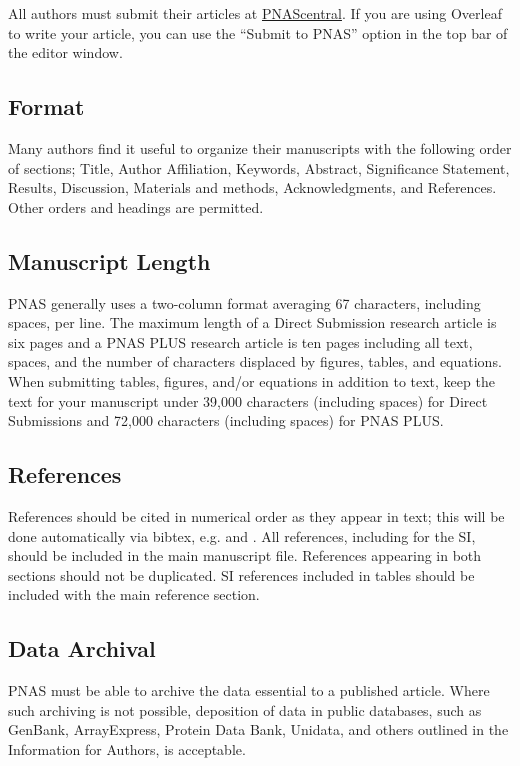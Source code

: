 \documentclass[9pt,twocolumn,twoside,lineno]{pnas-new}
\begin{document}
All authors must submit their articles at \href{http://www.pnascentral.org/cgi-bin/main.plex}{PNAScentral}. If you are using Overleaf to write your article, you can use the ``Submit to PNAS'' option in the top bar of the editor window.

\subsection*{Format}

Many authors find it useful to organize their manuscripts with the following order of sections;  Title, Author Affiliation, Keywords, Abstract, Significance Statement, Results, Discussion, Materials and methods, Acknowledgments, and References. Other orders and headings are permitted.

\subsection*{Manuscript Length}

PNAS generally uses a two-column format averaging 67 characters, including spaces, per line. The maximum length of a Direct Submission research article is six pages and a PNAS PLUS research article is ten pages including all text, spaces, and the number of characters displaced by figures, tables, and equations.  When submitting tables, figures, and/or equations in addition to text, keep the text for your manuscript under 39,000 characters (including spaces) for Direct Submissions and 72,000 characters (including spaces) for PNAS PLUS.

\subsection*{References}

References should be cited in numerical order as they appear in text; this will be done automatically via bibtex, e.g. \cite{belkin2002using} and \cite{berard1994embedding,coifman2005geometric}. All references, including for the SI, should be included in the main manuscript file. References appearing in both sections should not be duplicated.  SI references included in tables should be included with the main reference section.

\subsection*{Data Archival}

PNAS must be able to archive the data essential to a published article. Where such archiving is not possible, deposition of data in public databases, such as GenBank, ArrayExpress, Protein Data Bank, Unidata, and others outlined in the Information for Authors, is acceptable.
\end{document}
